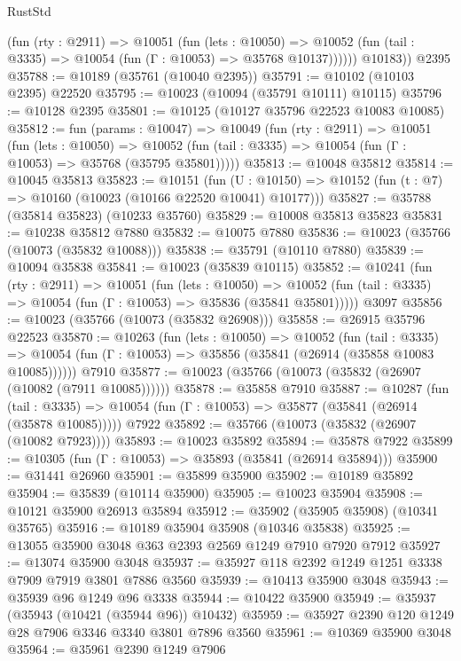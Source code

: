 \begin{lexlean}{RustStd}
\begin{coremodule}
            (fun (rty : @2911) =>
            @10051
              (fun (lets : @10050) =>
              @10052 (fun (tail : @3335) => @10054 (fun (Γ : @10053) => @35768 @10137))))))
        @10183))
    @2395
@35788 := @10189 (@35761 (@10040 @2395))
@35791 := @10102 (@10103 @2395) @22520
@35795 := @10023 (@10094 (@35791 @10111) @10115)
@35796 := @10128 @2395
@35801 := @10125 (@10127 @35796 @22523 @10083 @10085)
@35812 := fun (params : @10047) =>
  @10049
    (fun (rty : @2911) =>
    @10051
      (fun (lets : @10050) =>
      @10052 (fun (tail : @3335) => @10054 (fun (Γ : @10053) => @35768 (@35795 @35801)))))
@35813 := @10048 @35812
@35814 := @10045 @35813
@35823 := @10151
    (fun (U : @10150) => @10152 (fun (t : @7) => @10160 (@10023 (@10166 @22520 @10041) @10177)))
@35827 := @35788 (@35814 @35823) (@10233 @35760)
@35829 := @10008 @35813 @35823
@35831 := @10238 @35812 @7880
@35832 := @10075 @7880
@35836 := @10023 (@35766 (@10073 (@35832 @10088)))
@35838 := @35791 (@10110 @7880)
@35839 := @10094 @35838
@35841 := @10023 (@35839 @10115)
@35852 := @10241
    (fun (rty : @2911) =>
    @10051
      (fun (lets : @10050) =>
      @10052 (fun (tail : @3335) => @10054 (fun (Γ : @10053) => @35836 (@35841 @35801)))))
    @3097
@35856 := @10023 (@35766 (@10073 (@35832 @26908)))
@35858 := @26915 @35796 @22523
@35870 := @10263
    (fun (lets : @10050) =>
    @10052
      (fun (tail : @3335) =>
      @10054 (fun (Γ : @10053) => @35856 (@35841 (@26914 (@35858 @10083 @10085))))))
    @7910
@35877 := @10023 (@35766 (@10073 (@35832 (@26907 (@10082 (@7911 @10085))))))
@35878 := @35858 @7910
@35887 := @10287
    (fun (tail : @3335) => @10054 (fun (Γ : @10053) => @35877 (@35841 (@26914 (@35878 @10085)))))
    @7922
@35892 := @35766 (@10073 (@35832 (@26907 (@10082 @7923))))
@35893 := @10023 @35892
@35894 := @35878 @7922
@35899 := @10305 (fun (Γ : @10053) => @35893 (@35841 (@26914 @35894)))
@35900 := @31441 @26960
@35901 := @35899 @35900
@35902 := @10189 @35892
@35904 := @35839 (@10114 @35900)
@35905 := @10023 @35904
@35908 := @10121 @35900 @26913 @35894
@35912 := @35902 (@35905 @35908) (@10341 @35765)
@35916 := @10189 @35904 @35908 (@10346 @35838)
@35925 := @13055 @35900 @3048 @363 @2393 @2569 @1249 @7910 @7920 @7912
@35927 := @13074 @35900 @3048
@35937 := @35927 @118 @2392 @1249 @1251 @3338 @7909 @7919 @3801 @7886 @3560
@35939 := @10413 @35900 @3048
@35943 := @35939 @96 @1249 @96 @3338
@35944 := @10422 @35900
@35949 := @35937 (@35943 (@10421 (@35944 @96)) @10432)
@35959 := @35927 @2390 @120 @1249 @28 @7906 @3346 @3340 @3801 @7896 @3560
@35961 := @10369 @35900 @3048
@35964 := @35961 @2390 @1249 @7906

\end{coremodule}
\end{lexlean}
